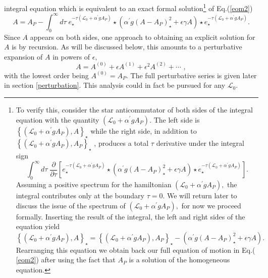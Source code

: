 \documentclass[a4paper,aps,preprint,nofootinbib,eqsecnum]{revtex4}
\begin{document}
integral equation which is equivalent to an exact formal solution\footnote{%
To verify this, consider the star anticommutator of both sides of the
integral equation with the quantity $\left( \mathcal{L}_{0}+\alpha ^{\prime
}gA_{P}\right) .$ The left side is $\left\{ \left( \mathcal{L}_{0}+\alpha
^{\prime }gA_{P}\right) ,A\right\} _{\star }$ while the right side, in
addition to $\left\{ \left( \mathcal{L}_{0}+\alpha ^{\prime }gA_{P}\right)
,A_{P}\right\} _{\star }$ , produces a total $\tau $ derivative under the
integral sign%
\begin{equation}
\int_{0}^{\infty }d\tau \;\frac{\partial }{\partial \tau }\left[ e_{\star
}^{-\tau \left( \mathcal{L}_{0}+\alpha ^{\prime }gA_{P}\right) }\star \left(
\alpha ^{\prime }g\left( A-A_{P}\right) _{\star }^{2}+\epsilon
\gamma A\right) \star
e_{\star }^{-\tau \left( \mathcal{L}_{0}+\alpha ^{\prime }gA_{P}\right) }%
\right] .
\end{equation}%
Assuming a positive spectrum for the hamiltonian $\left( \mathcal{L}%
_{0}+\alpha ^{\prime }gA_{P}\right) ,$ the integral contributes only at the
boundary $\tau =0.$ We will return later to discuss the issue of the
spectrum of $\left( \mathcal{L}_{0}+\alpha ^{\prime }gA_{P}\right) ,$ for
now we proceed formally. Inserting the result of the integral, the left and
right sides of the equation yield%
\begin{equation}
\left\{ \left( \mathcal{L}_{0}+\alpha ^{\prime }gA_{P}\right)
,A\right\} _{\star }=\left\{ \left( \mathcal{L}_{0}+\alpha
^{\prime }gA_{P}\right) ,A_{P}\right\} _{\star }- \left( \alpha
^{\prime }g\left( A-A_{P}\right) _{\star }^{2}+\epsilon\gamma
A\right) .
\end{equation}%
Rearranging this equation we obtain back our full equation of motion in Eq.(%
\ref{eom2}) after using the fact that $A_{P}$ is a solution of the
homogeneous equation.\label{intEq}} of Eq.(\ref{eom2})%
\begin{equation}
A=A_{P}-\int_{0}^{\infty }d\tau \;e_{\star }^{-\tau \left( \mathcal{L}%
_{0}+\alpha ^{\prime }gA_{P}\right) }\star \left( \alpha ^{\prime }g\left(
A-A_{P}\right) _{\star }^{2}+\epsilon \gamma A\right) \star e_{\star
}^{-\tau \left( \mathcal{L}_{0}+\alpha ^{\prime }gA_{P}\right) }.
\label{int}
\end{equation}%
Since $A$ appears on both sides, one approach to obtaining an explicit
solution for $A$ is by recursion. As will be discussed below, this amounts
to a perturbative expansion of $A$ in powers of $\epsilon ,$
\begin{equation}
A=A^{\left( 0\right) }+\epsilon A^{\left( 1\right) }+\epsilon ^{2}A^{\left(
2\right) }+\cdots \,\,,
\end{equation}%
with the lowest order being $A^{\left( 0\right) }=A_{P}$. The full
perturbative series is given later in section \ref{perturbation}. This
analysis could in fact be pursued for any ${\mathcal{L}_{0}.}$
\end{document}
